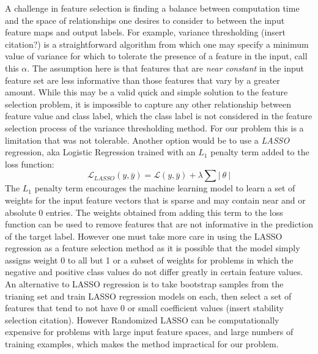 \documentclass{article}
\begin{document}
A challenge in feature selection is finding a balance between computation time and the space of relationships one desires to consider to between the input feature maps and output labels. For example, variance thresholding (insert citation?) is a straightforward algorithm from which one may specify a minimum value of variance for which to tolerate the presence of a feature in the input, call this $\alpha$. The assumption here is that features that are \emph{near constant} in the input feature set are less informative than those features that vary by a greater amount. While this may be a valid quick and simple solution to the feature selection problem, it is impossible to capture any other relationship between feature value and class label, which the class label is not considered in the feature selection process of the variance thresholding method. For our problem this is a limitation that was not tolerable. Another option would be to use a \emph{LASSO} regression, aka Logistic Regression trained with an $L_{1}$ penalty term added to the loss function:
\begin{equation}
\mathcal{L}_{LASSO}(y,\bar{y}) = \mathcal{L}(y,\bar{y})+ \lambda \sum | ~ \theta  ~ |
\end{equation} 
The $L_{1}$ penalty term encourages the machine learning model to learn a set of weights for the input feature vectors that is sparse and may contain near and or absolute 0 entries. The weights obtained from adding this term to the loss function can be used to remove features that are not informative in the prediction of the target label. However one must take more care in using the LASSO regression as a feature selection method as it is possible that the model simply assigns weight 0 to all but 1 or a subset of weights for problems in which the negative and positive class values do not differ greatly in certain feature values. An alternative to LASSO regression is to take bootstrap samples from the trianing set and train LASSO regression models on each, then select a set of features that tend to not have 0 or small coefficient values (insert stability selection citation). However Randomized LASSO can be computationally expensive for problems with large input feature spaces, and large numbers of training examples, which makes the method impractical for our problem. 
\end{document}
